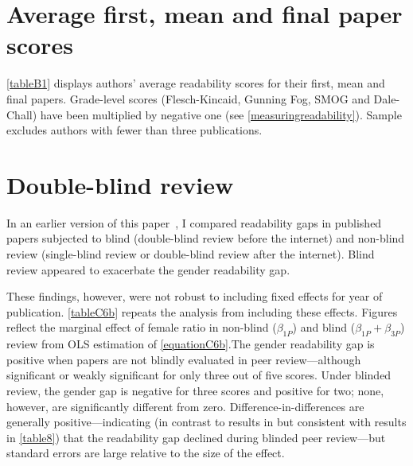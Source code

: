 \begin{appendices}
\section{Average first, mean and final paper scores}
\label{appendixfirstlast}

\autoref{tableB1} displays authors' average readability scores for their first, mean and final papers. Grade-level scores (Flesch-Kincaid, Gunning Fog, SMOG and Dale-Chall) have been multiplied by negative one (see \autoref{measuringreadability}). Sample excludes authors with fewer than three publications.



\clearpage

\section{Double-blind review}
\label{appendixdoubleblind}

In an earlier version of this paper~\citep{Hengel2015}, I compared readability gaps in published papers subjected to blind (double-blind review before the internet) and non-blind review (single-blind review or double-blind review after the internet). Blind review appeared to exacerbate the gender readability gap.

These findings, however, were not robust to including fixed effects for year of publication. \autoref{tableC6b} repeats the analysis from  \citet[][Table 3.9 (first panel), p. 65]{Hengel2015} including these effects. Figures reflect the marginal effect of female ratio in non-blind ($\beta_{1P}$) and blind ($\beta_{1P}+\beta_{3P}$) review from OLS estimation of \autoref{equationC6b}.The gender readability gap is positive when papers are not blindly evaluated in peer review---although significant or weakly significant for only three out of five scores. Under blinded review, the gender gap is negative for three scores and positive for two; none, however, are significantly different from zero. Difference-in-differences are generally positive---indicating (in contrast to results in \citet{Hengel2015} but consistent with results in \autoref{table8}) that the readability gap declined during blinded peer review---but standard errors are large relative to the size of the effect.




\end{appendices}
